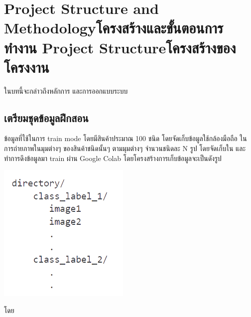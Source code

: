 \chapter{\ifproject%
\ifenglish Project Structure and Methodology\else โครงสร้างและขั้นตอนการทำงาน\fi
\else%
\ifenglish Project Structure\else โครงสร้างของโครงงาน\fi
\fi
}

ในบทนี้จะกล่าวถึงหลักการ และการออกแบบระบบ

\makeatletter


\makeatother

\section{เตรียมชุดข้อมูลฝึกสอน}
ข้อมูลที่ใช้ในการ train mode โดยมีสินค้าประมาณ 100 ชนิด โดยจัดเก็บข้อมูลใช้กล้องมือถือ ในการถ่ายภาพในมุมต่างๆ
ของสินค้าชนิดนั้นๆ ตามมุมต่างๆ จำนวนชนิดละ N รูป โดยจัดเก็บใน  และทำการดึงข้อมูลมา train ผ่าน Google Colab
 โดยโครงสร้างการเก็บข้อมูลจะเป็นดังรูป


 
\begin{center}
  \includegraphics[scale=0.45]{pic/st.png}
\end{center}
  โดย
 
